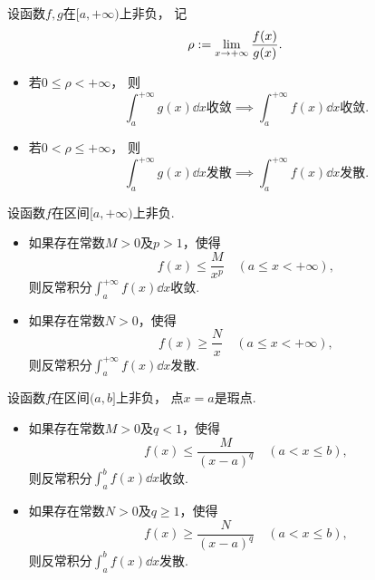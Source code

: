 \begin{corollary}[比较审敛原理的极限形式]
设函数\(f,g\)在\([a,+\infty)\)上非负，
记\[
	\rho := \lim_{x\to+\infty} \frac{f(x)}{g(x)}.
\]
\begin{itemize}
	\item 若\(0 \leq \rho < +\infty\)，
	则\[
		\text{\(\int_a^{+\infty} g(x) \dd{x}\)收敛}
		\implies
		\text{\(\int_a^{+\infty} f(x) \dd{x}\)收敛}.
	\]
	\item 若\(0 < \rho \leq +\infty\)，
	则\[
		\text{\(\int_a^{+\infty} g(x) \dd{x}\)发散}
		\implies
		\text{\(\int_a^{+\infty} f(x) \dd{x}\)发散}.
	\]
\end{itemize}
\end{corollary}

\begin{theorem}[比较审敛法1]\label{theorem:定积分.无穷限反常积分的比较审敛法}
设函数\(f\)在区间\([a,+\infty)\)上非负.
\begin{itemize}
	\item 如果存在常数\(M>0\)及\(p>1\)，使得\[
		f(x) \leq \frac{M}{x^p}
		\quad(a \leq x < +\infty),
	\]
	则反常积分\(\int_a^{+\infty} f(x) \dd{x}\)收敛.
	\item 如果存在常数\(N>0\)，使得\[
		f(x) \geq \frac{N}{x}
		\quad(a \leq x < +\infty),
	\]
	则反常积分\(\int_a^{+\infty} f(x) \dd{x}\)发散.
\end{itemize}
\end{theorem}

\begin{theorem}[比较审敛法2]\label{theorem:定积分.无界函数的反常积分的比较审敛法}
设函数\(f\)在区间\((a,b]\)上非负，
点\(x=a\)是瑕点.
\begin{itemize}
	\item 如果存在常数\(M > 0\)及\(q < 1\)，使得\[
		f(x) \leq \frac{M}{(x-a)^q}
		\quad(a < x \leq b),
	\]
	则反常积分\(\int_a^b f(x) \dd{x}\)收敛.
	\item 如果存在常数\(N > 0\)及\(q \geq 1\)，使得\[
		f(x) \geq \frac{N}{(x-a)^q}
		\quad(a < x \leq b),
	\]
	则反常积分\(\int_a^b f(x) \dd{x}\)发散.
\end{itemize}
\end{theorem}

